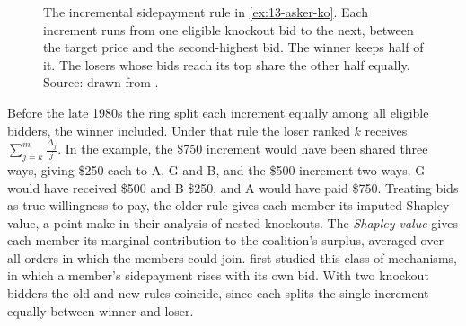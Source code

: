 \begin{figure}[htbp]
\centering
{}
\caption{The incremental sidepayment rule in \cref{ex:13-asker-ko}. Each increment runs from one eligible knockout
bid to the next, between the target price and the second-highest bid. The winner keeps half of it. The losers whose
bids reach its top share the other half equally. Source: drawn from \citet[Example 1]{Asker2010}.}
\label{fig:13-asker-numberline}
\end{figure}

Before the late 1980s the ring split each increment equally among all eligible bidders, the winner included.
Under that rule the loser ranked $k$ receives $\sum_{j=k}^{m}\frac{\Delta_j}{j}$. In the example, the \$750
increment would have been shared three ways, giving \$250 each to A, G and B, and the \$500 increment two
ways. G would have received \$500 and B \$250, and A would have paid \$750. Treating bids as true
willingness to pay, the older rule gives each member its imputed Shapley value, a point
\citet{GrahamMarshall1987} make in their analysis of nested knockouts. The \emph{Shapley value} gives each member
its marginal contribution to the coalition's surplus, averaged over all orders in which the members could join. \citet{GrahamMarshallRichard1990} first
studied this class of mechanisms, in which a member's sidepayment rises with its own bid. With two knockout
bidders the old and new rules coincide, since each splits the single increment equally between winner and
loser.

